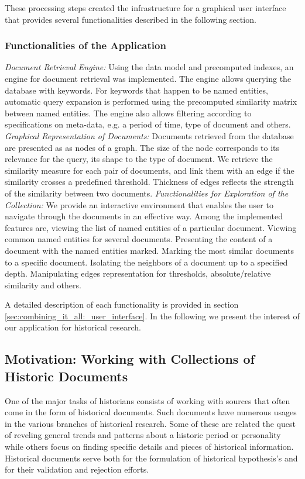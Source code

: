 These processing steps created the infrastructure for a graphical user interface that provides several   functionalities described in the following section.

\subsubsection{Functionalities of the Application}

\emph{Document Retrieval Engine:} Using the data model and precomputed indexes, an engine for document retrieval was implemented. The engine allows querying the database with keywords. For keywords that happen to be named entities, automatic query expansion is performed using the precomputed similarity matrix between named entities.  The engine also allows filtering according to specifications on meta-data, e.g. a period of time, type of document and others. 
\emph{Graphical Representation of Documents:} Documents retrieved from the database are presented as as nodes of a graph. The size of the node corresponds to its relevance for the query, its shape to the type of document.  We retrieve the similarity measure for each pair of documents, and link them with an edge if the similarity crosses a predefined threshold. Thickness of edges reflects the strength of the similarity between two documents.
\emph{Functionalities for Exploration of the Collection:} We provide an interactive environment that enables the user to navigate through the documents in an effective way. Among the implemented features are, viewing the list of named entities of a particular document. Viewing common named entities for several documents. Presenting the content of a document with the named entities marked. Marking the most similar documents to a specific document. Isolating the neighbors of a document up to a specified depth. Manipulating edges representation for thresholds, absolute/relative similarity and others.

A detailed description of each functionality is provided in section \ref{sec:combining_it_all:_user_interface}. In the following we present the interest of our application for historical research. 

\subsection{Motivation: Working with Collections of Historic Documents}
\label{sec:motivation}
One of the major tasks of historians consists of working with sources that often come in the form of historical documents. Such documents have numerous usages in the various branches of historical research. Some of these are related the quest of reveling general trends and patterns about a historic period or personality while others focus on finding specific details and pieces of historical information. Historical documents serve both for the formulation of historical hypothesis's and for their validation and rejection efforts. 


